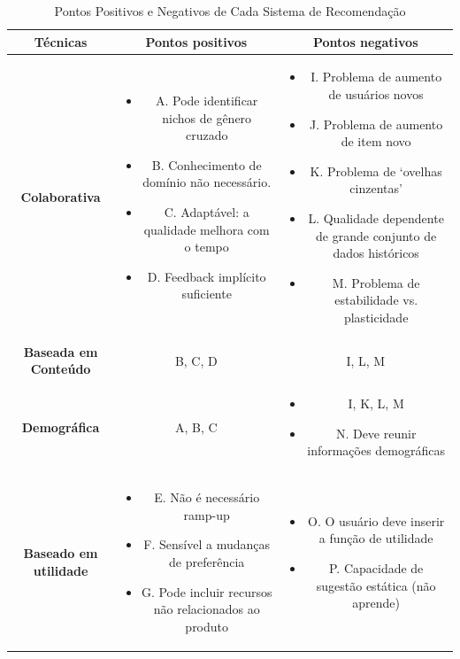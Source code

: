\begin{table}[ht]
	\centering
	\caption{Pontos Positivos e Negativos de Cada Sistema de Recomendação}
	\label{tab03}
	\begin{tabular}{ccc}
	\toprule
	\textbf{Técnicas} & \textbf{Pontos positivos } & \textbf{Pontos negativos}  \\ 
	\midrule
	\textbf{Colaborativa} & \begin{minipage} [t] {0.3\textwidth} \begin{itemize} \item 	A. Pode identificar nichos de gênero cruzado \item B. Conhecimento de domínio não necessário. \item C. Adaptável: a qualidade melhora com o tempo \item D. Feedback implícito suficiente \end{itemize} \end{minipage} & \begin{minipage} [t] {0.3\textwidth} \begin{itemize} \item	I. Problema de aumento de usuários novos \item J. Problema de aumento de item novo \item K. Problema de ‘ovelhas cinzentas’ \item L. Qualidade dependente de grande conjunto de dados históricos \item M. Problema de estabilidade vs. plasticidade\end{itemize} \end{minipage}  \\ 
	\midrule
	\textbf{Baseada em Conteúdo} & B, C, D & I, L, M \\ 
	\midrule
	\textbf{Demográfica} & A, B, C  & \begin{minipage} [t] {0.3\textwidth} \begin{itemize} \item I, K, L, M \item N. Deve reunir informações demográficas\end{itemize} \end{minipage} \\ 
	\midrule
	\textbf{Baseado em utilidade}  & \begin{minipage} [t] {0.3\textwidth} \begin{itemize} \item  E. Não é necessário ramp-up \item F. Sensível a mudanças de preferência \item{G. Pode incluir recursos não relacionados ao produto}\end{itemize} \end{minipage} & \begin{minipage} [t] {0.3\textwidth} \begin{itemize} \item O. O usuário deve inserir a função de utilidade \item P. Capacidade de sugestão estática (não aprende)\end{itemize} \end{minipage} \\ 

\end{tabular}
\end{table}
